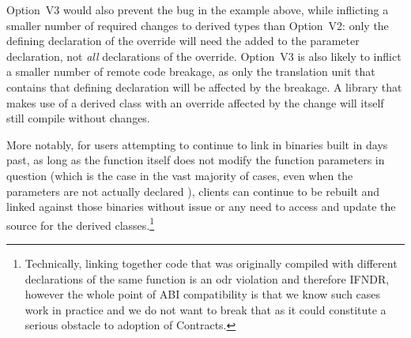 Option~V3 would also prevent the bug in the example above, while inflicting a smaller number of required changes to derived types than Option~V2: only the defining declaration of the override will need the  added to the parameter declaration, not \emph{all} declarations of the override.
Option~V3 is also likely to inflict a smaller number of remote code breakage, as only the translation unit that contains that defining declaration will be affected by the breakage. A library that makes use of a derived class with an override affected by the change will itself still compile without changes.

More notably, for users attempting to continue to link in binaries built in days past, as long as the function itself does not modify the function parameters in question (which is the case in the vast majority of cases, even when the parameters are not actually declared ), clients can continue to be rebuilt and linked against those binaries without issue or any need to access and update the source for the derived classes.\footnote{Technically, linking together code that was originally compiled with different declarations of the same function is an odr violation and therefore IFNDR, however the whole point of ABI compatibility is that we know such cases work in practice and we do not want to break that as it could constitute a serious obstacle to adoption of Contracts.}

